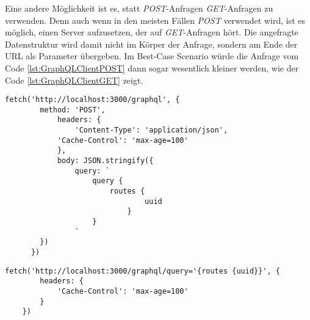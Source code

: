 Eine andere Möglichkeit ist es, statt \textit{POST}-Anfragen \textit{GET}-Anfragen zu verwenden. Denn auch wenn in den meisten Fällen \textit{POST} verwendet wird, ist es möglich, einen Server aufzusetzen, der auf \textit{GET}-Anfragen hört. Die angefragte Datenstruktur wird damit nicht im Körper der Anfrage, sondern am Ende der \ac{URL} als Parameter übergeben. Im Best-Case Scenario würde die Anfrage vom Code \ref{lst:GraphQLClientPOST} dann sogar wesentlich kleiner werden, wie der Code \ref{lst:GraphQLClientGET} zeigt.
\begin{lstlisting}[caption={GraphQL POST-Anfrage},captionpos=b,label=lst:GraphQLClientPOST] 
	fetch('http://localhost:3000/graphql', {
	   	method: 'POST',									
	    	headers: {
	      		'Content-Type': 'application/json',
			'Cache-Control': 'max-age=100'
	    	},
	    	body: JSON.stringify({
	      		query: `
	      			query { 
	       				routes { 
	          					uuid
	        				} 
	      			}
	      		` 
		})
	  })
\end{lstlisting}
\begin{minipage}{\linewidth}
\begin{lstlisting}[caption={GraphQL GET-Anfrage},captionpos=b,label=lst:GraphQLClientGET] 
	fetch('http://localhost:3000/graphql/query='{routes {uuid}}', {					
		headers: {
			'Cache-Control': 'max-age=100'
		}
	})
\end{lstlisting}
\end{minipage}

